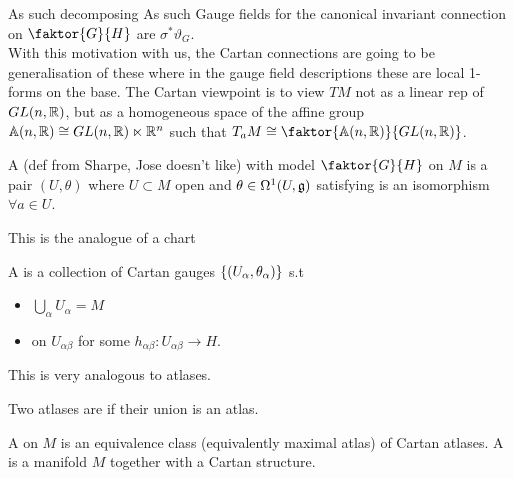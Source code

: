 \documentclass{article}
\begin{document}
As such decomposing 
As such 
Gauge fields for the canonical invariant connection on $\faktor{G}{H}$ are $\sigma^\ast \vartheta_G$. \\
With this motivation with us, the Cartan connections are going to be generalisation of these where in the gauge field descriptions these are local 1-forms on the base. The Cartan viewpoint is to view $TM$ not as a linear rep of $GL(n,\mathbb{R})$, but as a homogeneous space of the affine group $\mathbb{A}(n,\mathbb{R})\cong GL(n,\mathbb{R}) \ltimes \mathbb{R}^n$ such that $T_a M \cong \faktor{\mbb{A}(n,\mbb{R})}{GL(n,\mbb{R})}$.

\begin{definition}
	A  (def from Sharpe, Jose doesn't like) with model $\faktor{G}{H}$ on $M$ is a pair $(U,\theta)$ where $U \subset M$ open and $\theta \in \Omega^1(U,\mathfrak{g})$ satisfying 
	is an isomorphism $\forall a \in U$. 
\end{definition}
This is the analogue of a chart
\begin{definition}
	A  is a collection of Cartan gauges $\left\{ (U_\alpha,\theta_\alpha) \right\}$ s.t 
	\begin{itemize}
		\item $\bigcup_{\alpha} U_\alpha = M $
		\item on $U_{\alpha\beta}$ 
		for some $h_{\alpha\beta}:U_{\alpha\beta} \to H$. 
	\end{itemize}
\end{definition}
This is very analogous to atlases. 
\begin{definition}
	Two atlases are  if their union is an atlas. 
\end{definition}

\begin{definition}
	A  on $M$ is an equivalence class (equivalently maximal atlas) of Cartan atlases. A  is a manifold $M$ together with a Cartan structure.  
\end{definition}
\end{document}
